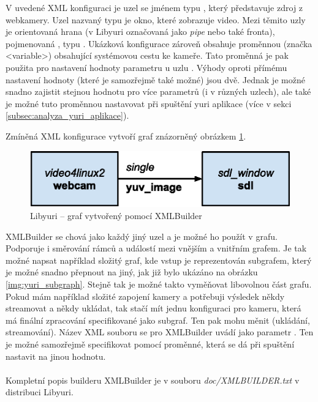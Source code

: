 \documentclass[thesis=M,czech]{FITthesis}[2012/06/26]
\begin{document}
V uvedené XML konfiguraci je uzel se jménem  typu , který představuje zdroj z webkamery. Uzel nazvaný  typu  je okno, které zobrazuje video. Mezi těmito uzly je orientovaná hrana (v Libyuri označovaná jako \textit{pipe} nebo také fronta), pojmenovaná , typu . Ukázková konfigurace zároveň obsahuje proměnnou (značka <variable>) obsahující systémovou cestu ke kameře. Tato proměnná je pak použita pro nastavení hodnoty parametru  u uzlu . Výhody oproti přímému nastavení hodnoty (které je samozřejmě také možné) jsou dvě. Jednak je možné snadno zajistit stejnou hodnotu pro více parametrů (i v různých uzlech), ale také je možné tuto proměnnou nastavovat při spuštění yuri aplikace (více v sekci \ref{subsec:analyza_yuri_aplikace}). 

Zmíněná XML konfigurace vytvoří graf znázorněný obrázkem \ref{img:yuri_vytvoreni_xml}.
\\
\begin{figure}[h]\centering
	\includegraphics[width=1\textwidth]{images/yuri_xml_graph.eps}
	\caption{Libyuri -- graf vytvořený pomocí XMLBuilder}\label{img:yuri_vytvoreni_xml}
\end{figure}

XMLBuilder se chová jako každý jiný uzel a je možné ho použít v grafu. Podporuje i směrování rámců a událostí mezi vnějším a vnitřním grafem. Je tak možné napsat například složitý graf, kde vstup je reprezentován subgrafem, který je možné snadno přepnout na jiný, jak již bylo ukázáno na obrázku \ref{img:yuri_subgraph}. Stejně tak je možné takto vyměňovat libovolnou část grafu. Pokud mám například složité zapojení kamery a potřebuji výsledek někdy streamovat a někdy ukládat, tak stačí mít jednu konfiguraci pro kameru, která má finální zpracování specifikované jako subgraf. Ten pak mohu měnit (ukládání, streamování). 
Název XML souboru se pro XMLBuilder uvádí jako parametr . Ten je možné samozřejmě specifikovat pomocí proměnné, která se dá při spuštění nastavit na jinou hodnotu. 
\\ \\
Kompletní popis builderu XMLBuilder je v souboru \textit{doc/XMLBUILDER.txt} v distribuci Libyuri.
\end{document}
